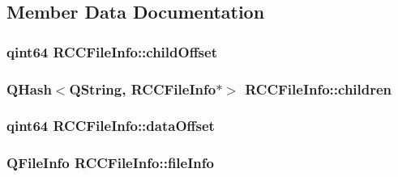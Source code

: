 \subsection{Member Data Documentation}
\hypertarget{structRCCFileInfo_aa6644ba7f6b72ef4fe80a9d0cf6f6e83}{}
\subsubsection[{child\+Offset}]{\setlength{\rightskip}{0pt plus 5cm}qint64 R\+C\+C\+File\+Info\+::child\+Offset}\label{structRCCFileInfo_aa6644ba7f6b72ef4fe80a9d0cf6f6e83}
\hypertarget{structRCCFileInfo_a10dc8d618749e88615fa59eb8458c3ce}{}
\subsubsection[{children}]{\setlength{\rightskip}{0pt plus 5cm}Q\+Hash$<$Q\+String, {\bf R\+C\+C\+File\+Info}$\ast$$>$ R\+C\+C\+File\+Info\+::children}\label{structRCCFileInfo_a10dc8d618749e88615fa59eb8458c3ce}
\hypertarget{structRCCFileInfo_a32220afc0a8f6d6748c48caaaefedf37}{}
\subsubsection[{data\+Offset}]{\setlength{\rightskip}{0pt plus 5cm}qint64 R\+C\+C\+File\+Info\+::data\+Offset}\label{structRCCFileInfo_a32220afc0a8f6d6748c48caaaefedf37}
\hypertarget{structRCCFileInfo_afc207131879f29502959baba420e7bb2}{}
\subsubsection[{file\+Info}]{\setlength{\rightskip}{0pt plus 5cm}Q\+File\+Info R\+C\+C\+File\+Info\+::file\+Info}\label{structRCCFileInfo_afc207131879f29502959baba420e7bb2}
\hypertarget{structRCCFileInfo_a8a6bdf23979de163aa9e9636467d7248}{}
